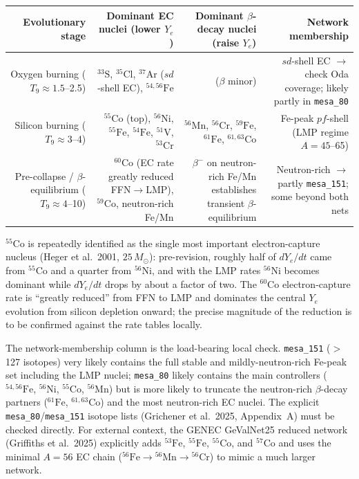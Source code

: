 \documentclass[11pt]{article}
\newcommand{\nuc}[2]{\ensuremath{{}^{#2}\mathrm{#1}}}
\newcommand{\Msun}{M_\odot}
\begin{document}
\begin{center}
\footnotesize
\setlength{\tabcolsep}{5pt}
\renewcommand{\arraystretch}{1.3}
\begin{tabularx}{\textwidth}{@{}R{0.95}R{1.1}R{1.0}R{0.95}@{}}
\toprule
\textbf{Evolutionary stage} & \textbf{Dominant EC nuclei (lower $Y_e$)} & \textbf{Dominant $\beta$-decay nuclei (raise $Y_e$)} & \textbf{Network membership} \\
\midrule
Oxygen burning ($T_9 \approx 1.5$--2.5) & $\nuc{S}{33}$, $\nuc{Cl}{35}$, $\nuc{Ar}{37}$ ($sd$-shell EC), $\nuc{Fe}{54,56}$ & ($\beta$ minor) & $sd$-shell EC $\to$ check Oda coverage; likely partly in \texttt{mesa\_80} \\
Silicon burning ($T_9 \approx 3$--4) & $\nuc{Co}{55}$ (top), $\nuc{Ni}{56}$, $\nuc{Fe}{55}$, $\nuc{Fe}{54}$, $\nuc{V}{51}$, $\nuc{Cr}{53}$ & $\nuc{Mn}{56}$, $\nuc{Cr}{56}$, $\nuc{Fe}{59}$, $\nuc{Fe}{61}$, $\nuc{Co}{61,63}$ & Fe-peak $pf$-shell (LMP regime $A = 45$--65) \\
Pre-collapse / $\beta$-equilibrium ($T_9 \approx 4$--10) & $\nuc{Co}{60}$ (EC rate greatly reduced FFN$\to$LMP), $\nuc{Co}{59}$, neutron-rich Fe/Mn & $\beta^-$ on neutron-rich Fe/Mn establishes transient $\beta$-equilibrium & Neutron-rich $\to$ partly \texttt{mesa\_151}; some beyond both nets \\
\bottomrule
\end{tabularx}
\end{center}

$\nuc{Co}{55}$ is repeatedly identified as the single most important electron-capture nucleus (Heger et al.\ 2001, $25\,\Msun$): pre-revision, roughly half of $dY_e/dt$ came from $\nuc{Co}{55}$ and a quarter from $\nuc{Ni}{56}$, and with the LMP rates $\nuc{Ni}{56}$ becomes dominant while $dY_e/dt$ drops by about a factor of two. The $\nuc{Co}{60}$ electron-capture rate is ``greatly reduced'' from FFN to LMP and dominates the central $Y_e$ evolution from silicon depletion onward; the precise magnitude of the reduction is to be confirmed against the rate tables locally.

The network-membership column is the load-bearing local check. \texttt{mesa\_151} ($>$127 isotopes) very likely contains the full stable and mildly-neutron-rich Fe-peak set including the LMP nuclei; \texttt{mesa\_80} likely contains the main controllers ($\nuc{Fe}{54,56}$, $\nuc{Ni}{56}$, $\nuc{Co}{55}$, $\nuc{Mn}{56}$) but is more likely to truncate the neutron-rich $\beta$-decay partners ($\nuc{Fe}{61}$, $\nuc{Co}{61,63}$) and the most neutron-rich EC nuclei. The explicit \texttt{mesa\_80}/\texttt{mesa\_151} isotope lists (Grichener et al.\ 2025, Appendix~A) must be checked directly. For external context, the GENEC GeValNet25 reduced network (Griffiths et al.\ 2025) explicitly adds $\nuc{Fe}{53}$, $\nuc{Fe}{55}$, $\nuc{Co}{55}$, and $\nuc{Co}{57}$ and uses the minimal $A = 56$ EC chain ($\nuc{Fe}{56} \to \nuc{Mn}{56} \to \nuc{Cr}{56}$) to mimic a much larger network.
\end{document}
